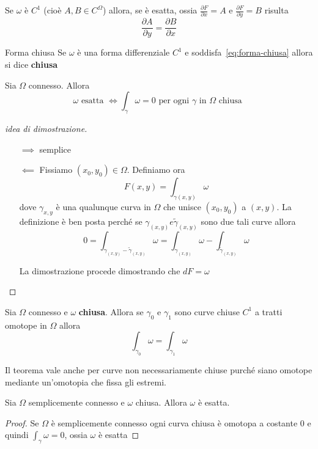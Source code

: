 Se \(\omega\) è \(C^{1}\) (cioè \(A, B \in C^{\Omega}\)) allora, se è esatta,
ossia \(\frac{\partial F}{\partial x} = A\) e \(\frac{\partial F}{\partial y} =
B\) risulta
\begin{equation}\label{eq:forma-chiusa}
    \frac{\partial A}{\partial y} = \frac{\partial B}{\partial x}
\end{equation}

\begin{definition}{Forma chiusa}
    Se \(\omega\) è una forma differenziale \(C^{1}\) e
    soddisfa~\eqref{eq:forma-chiusa} allora si dice \textbf{chiusa} 
\end{definition}
\begin{theorem}\label{thm:1_forme}
    Sia \(\Omega\) connesso. Allora 
    \[
        \omega \text{ esatta } \iff \int_{\gamma} \omega = 0 \text{ per ogni
        \(\gamma\) in \(\Omega\) chiusa }
    \]
\end{theorem}
\begin{proof}[idea di dimostrazione]\( \)
\begin{itemize}
    \item[\(\implies \)] semplice
    \item[\(\impliedby \)] Fissiamo \((x_{0},y_{0}) \in \Omega\). Definiamo ora 
        \[
            F(x, y) = \int_{\gamma(x,y)} \omega
        \]
        dove \(\gamma_{x,y} \) è una qualunque curva in \(\Omega\) che unisce
        \((x_{0},y_{0})\) a \((x,y)\). La definizione è ben posta perché se
        \(\gamma_{(x,y)} e \tilde{\gamma}_{(x,y)}\) sono due tali curve allora
        \[
            0 = \int_{\gamma_{(x,y)} - \tilde{\gamma}_{(x,y)}} \omega =
            \int_{\gamma_{(x,y)}} \omega - \int_{\tilde{\gamma}_{(x,y)}} \omega
        \]

        La dimostrazione procede dimostrando che \(dF = \omega\)
\end{itemize}
\end{proof}

\begin{theorem}\label{thm:2_forme}
    Sia \(\Omega\) connesso e \(\omega\) \textbf{chiusa}. Allora se
    \(\gamma_{0}\) e \(\gamma_{1}\) sono curve chiuse \(C^{1}\) a tratti omotope
    in \(\Omega\) allora
    \[
        \int_{\gamma_{0}} \omega = \int_{\gamma_{1}} \omega
    \]
\end{theorem}
\begin{remark}
    Il teorema vale anche per curve non necessariamente chiuse purché siano omotope 
    mediante un'omotopia che fissa gli estremi.
\end{remark}

\begin{corollary}
    Sia \(\Omega\) semplicemente connesso e \(\omega\) chiusa. Allora \(\omega\)
    è esatta.
\end{corollary}
\begin{proof}
    Se \(\Omega\) è semplicemente connesso ogni curva chiusa è omotopa a
    costante \(0\) e quindi \(\int_{\gamma} \omega = 0\), ossia \(\omega\) è
    esatta 
\end{proof}



